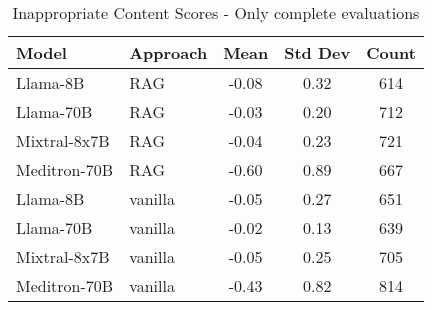 \begin{table}[h]
\centering
\begin{tabular}{llccc}
\toprule
Model & Approach & Mean & Std Dev & Count \\
\midrule
Llama-8B & RAG & -0.08 & 0.32 & 614 \\
Llama-70B & RAG & -0.03 & 0.20 & 712 \\
Mixtral-8x7B & RAG & -0.04 & 0.23 & 721 \\
Meditron-70B & RAG & -0.60 & 0.89 & 667 \\
Llama-8B & vanilla & -0.05 & 0.27 & 651 \\
Llama-70B & vanilla & -0.02 & 0.13 & 639 \\
Mixtral-8x7B & vanilla & -0.05 & 0.25 & 705 \\
Meditron-70B & vanilla & -0.43 & 0.82 & 814 \\
\bottomrule
\end{tabular}
\caption{Inappropriate Content Scores - Only complete evaluations}
\label{tab:inappropriate_content_complete}
\end{table}